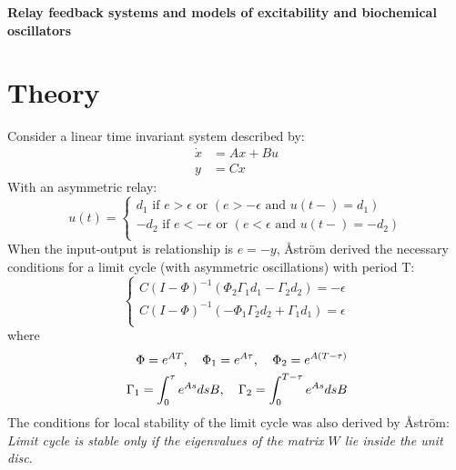\documentclass[a4paper]{article}
\begin{document}
\begin{center}

{\huge{{\textbf{Relay feedback systems and models of excitability and biochemical oscillators}}}}\hline\vspace{0.1cm}
\end{center}

\section{Theory} 
Consider a linear time invariant system described by:
\begin{align}\dot{x} &= Ax + Bu  \\
y &= Cx\end{align}
With an asymmetric relay:
\begin{equation}
	u(t)=\begin{cases}
	               d_1 \text{ if } e > \epsilon \text{ or } (e >-\epsilon \text{ and } u(t-) = d_1)\\
	                -d_2 \text{ if } e < -\epsilon \text{ or } (e < \epsilon \text{ and } u(t-) = -d_2)\\
	              
	            \end{cases}
\end{equation}
When the input-output is relationship is $e = -y$,  \r{A}str\"{o}m\cite{astrom1995} derived the necessary conditions for a limit cycle (with asymmetric oscillations)  with period T:
\begin{equation}
\label{theorem5_1}
\begin{cases}
	        C(I - \Phi)^{-1}(\Phi_2\Gamma_1d_1 - \Gamma_2d_2) = -\epsilon\\
	        C(I - \Phi)^{-1}(-\Phi_1\Gamma_2d_2 + \Gamma_1d_1) = \epsilon        \\
	              
	            \end{cases}
\end{equation}
where
\begin{align}\Phi = e^{AT} \text{,\hspace{0.3cm}  } \Phi_1 = e^{A\tau} \text{,\hspace{0.3cm}  } \Phi_2 = e^{A(T-\tau)} \\
\Gamma_1 = \int_{0}^{\tau}e^{As}dsB\text{,\hspace{0.3cm}  } \Gamma_2 = \int_{0}^{T-\tau}e^{As}dsB
\end{align}
The conditions for local stability of the limit cycle was also derived by \r{A}str\"{o}m\cite{astrom1995}:\\
\emph{Limit cycle is stable only if the eigenvalues of the matrix $W$ lie inside the unit disc.} 
\end{document}
